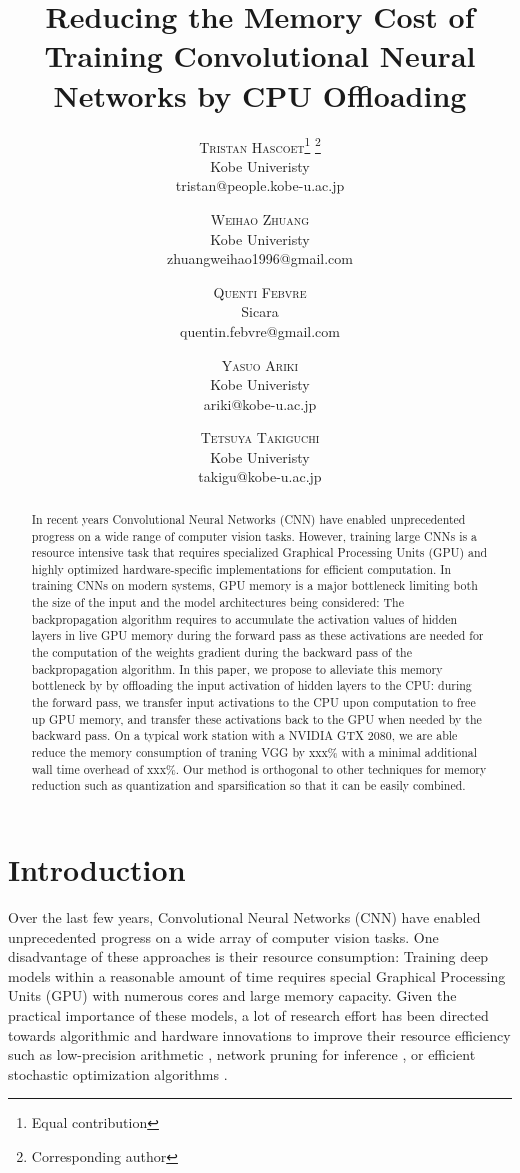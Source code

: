 \documentclass[11pt,onecolumn]{article}
\title{Reducing the Memory Cost of Training Convolutional Neural Networks by CPU Offloading} %
\author{%
	\textsc{Tristan Hascoet}\thanks{Equal contribution} \thanks{Corresponding author} \\ %
	\normalsize Kobe Univeristy \\ %
	\normalsize tristan@people.kobe-u.ac.jp %
	\and %
	\textsc{Weihao Zhuang}\footnotemark[1] \\ %
	\normalsize Kobe Univeristy \\ %
	\normalsize zhuangweihao1996@gmail.com %
	\and %
	\textsc{Quenti Febvre} \\ %
    \normalsize Sicara \\ %
    \normalsize quentin.febvre@gmail.com  %
    \and %
    \textsc{Yasuo Ariki} \\ %
    \normalsize Kobe Univeristy \\ %
	\normalsize ariki@kobe-u.ac.jp %
	\and %
    \textsc{Tetsuya Takiguchi} \\ %
    \normalsize Kobe Univeristy \\ %
	\normalsize takigu@kobe-u.ac.jp %
}
\date{\vspace{-1ex}}
\begin{document}
	
\maketitle
	
\begin{abstract}

In recent years Convolutional Neural Networks (CNN) have enabled 
unprecedented progress on a wide range of computer vision tasks. 
However, training large CNNs is a resource intensive task that requires 
specialized Graphical Processing Units (GPU) and highly optimized 
hardware-specific implementations for efficient computation. 
In training CNNs on modern systems, GPU memory is a major bottleneck limiting both 
the size of the input and the model architectures being considered:
The backpropagation algorithm requires to accumulate the activation 
values of hidden layers in live GPU memory during the forward pass
as these activations are needed for the computation of the weights 
gradient during the backward pass of the backpropagation algorithm.
In this paper, we propose to alleviate this memory bottleneck by 
by offloading the input activation of hidden layers to the CPU:
during the forward pass, we transfer input activations to the CPU upon
computation to free up GPU memory, and transfer these
activations back to the GPU when needed by the backward pass.
On a typical work station with a NVIDIA GTX 2080, we are able reduce the 
memory consumption of traning VGG by xxx\% with a minimal additional 
wall time overhead of xxx\%. 
Our method is orthogonal to other techniques for memory reduction such as 
quantization and sparsification so that it can be easily combined.

\end{abstract}

\section{Introduction}
Over the last few years, Convolutional Neural Networks (CNN) 
have enabled unprecedented progress on a wide array of computer vision tasks.
One disadvantage of these approaches is their resource consumption: 
Training deep models within a reasonable amount of time requires special
Graphical Processing Units (GPU) with numerous cores and large memory capacity.
Given the practical importance of these models, a lot of research effort has been directed
towards algorithmic and hardware innovations to improve their resource efficiency such as low-precision arithmetic \cite{jacob2018quantization}, network pruning for inference \cite{molchanov2016pruning}, or efficient stochastic optimization algorithms \cite{kingma2014adam}.
\end{document}
